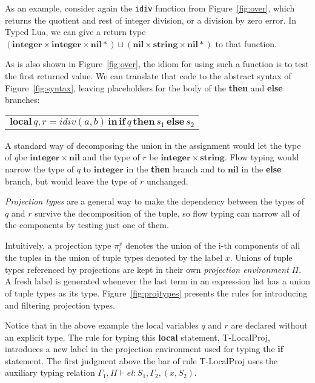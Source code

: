 \documentclass[preprint]{sigplanconf}
\newcommand{\Nil}{\mathbf{nil}}
\newcommand{\Integer}{\mathbf{integer}}
\newcommand{\String}{\mathbf{string}}
\newcommand{\env}{\Gamma}
\newcommand{\penv}{\Pi}
\begin{document}
As an example, consider again the {\tt idiv} function
from Figure~\ref{fig:over}, which returns the quotient and rest of integer division, or a division by zero error. In Typed Lua, we can give a return type $(\Integer \times \Integer \times \Nil*) \sqcup (\Nil \times \String \times \Nil{*})$ to that function. 

As is also shown in Figure~\ref{fig:over}, the idiom for using such
a function is to test the first returned value. We
can translate that code to the abstract syntax of
Figure~\ref{fig:syntax}, leaving placeholders for
the body of the {\bf then} and {\bf else} branches:
\begin{center}
	\begin{tabular}{ll}
		\multicolumn{2}{l}{$\mathbf{local} \, q, r = idiv(a, b) \, \mathbf{in} \, \mathbf{if} \, q \, \mathbf{then} \, s_1 \, \mathbf{else} \, s_2$}
	\end{tabular}
\end{center}

A standard way of decomposing the union in the assignment
would let the type of $q$be $\Integer \times \Nil$ and
the type of $r$ be $\Integer \times \String$. Flow typing
would narrow the type of $q$ to $\Integer$ in the {\bf then}
branch and to $\Nil$ in the {\bf else} branch, but would
leave the type of $r$ unchanged.

{\em Projection types}
are a general way to make the dependency between the types
of $q$ and $r$ survive the decomposition of the tuple,
so flow typing can narrow all of the components by testing
just one of them.

Intuitively, a projection type $\pi_{i}^{x}$ denotes the union of
the i-th components of all the tuples in the union of tuple types
denoted by the label $x$. Unions of tuple types referenced by projections are kept in their own {\em projection environment} $\Pi$. A fresh label is generated whenever the last term
in an expression list has a union of tuple types as its type.
Figure~\ref{fig:projtypes} presents the rules for introducing and filtering projection types.

Notice that in the above example the local variables $q$ and $r$ are declared without an explicit type. 
 The rule for typing this {\bf local} statement,
{\sc T-LocalProj}, introduces a new label in the projection
environment used for typing the {\bf if} statement.
The first judgment above the bar of rule {\sc T-LocalProj} uses the auxiliary typing relation $\env_{1}, \penv \vdash el : S_{1}, \env_{2}, (x,S_{2})$.
\end{document}
